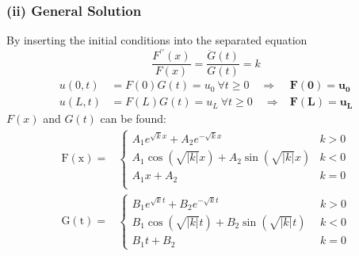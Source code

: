 \subsubsection{(ii) General Solution}
By inserting the initial conditions into the separated equation
\begin{equation*}
    \frac{F^{\prime\prime}(x)}{F(x)}=\frac{\ddot{G}(t)}{G(t)}=k
\end{equation*}
\begin{align*}
    u(0,t)&=F(0)G(t)=u_0\mathrm{~}\forall t\geq0\quad\Rightarrow&\mathbf{F(0)}=\mathbf{u_0}\\
    u(L,t)&=F(L)G(t)=u_L\mathrm{~}\forall t\geq0\quad\Rightarrow&\mathbf{F(L)}=\mathbf{u_L}
\end{align*}
$F(x)$ and $G(t)$ can be found:
\begin{align*}
    \mathrm{F(x)}=&
    \begin{cases}
        A_1e^{\sqrt{k}x}+A_2e^{-\sqrt{k}x}&k>0\\
        A_1\cos(\sqrt{|k|}x)+A_2\sin(\sqrt{|k|}x)&k<0\\
        A_1x+A_2&k=0\\
    \end{cases}\\
    \mathrm{G(t)}=&
    \begin{cases}
        B_1e^{\sqrt{k}t}+B_2e^{-\sqrt{k}t}&\;\,k>0\\
        B_1\cos(\sqrt{|k|}t)+B_2\sin(\sqrt{|k|}t)&\;\,k<0\\
        B_1t+B_2&\;\,k=0
    \end{cases}
\end{align*}
%
%
